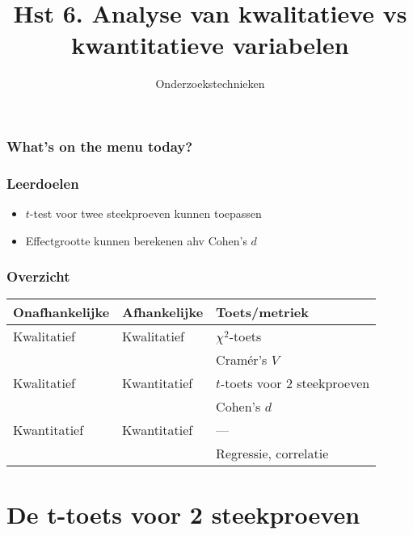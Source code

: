 \documentclass[aspectratio=169]{beamer}
\title{Hst 6. Analyse van kwalitatieve vs kwantitatieve variabelen}
\subtitle{Onderzoekstechnieken}
\begin{document}
\begin{frame}
  \maketitle
\end{frame}

\begin{frame}
  \frametitle{What's on the menu today?}

  \tableofcontents
\end{frame}

\begin{frame}
  \frametitle{Leerdoelen}

  \begin{itemize}
    \item $t$-test voor twee steekproeven kunnen toepassen
    \item Effectgrootte kunnen berekenen ahv Cohen's $d$
  \end{itemize}
\end{frame}

\begin{frame}
  \frametitle{Overzicht}
  \centering
  \begin{tabular}{lll}
    \toprule
    \textbf{Onafhankelijke} & \textbf{Afhankelijke} & \textbf{Toets/metriek}        \\
    \midrule
    Kwalitatief             & Kwalitatief           & $\chi^2$-toets                \\
    &                       & Cramér's $V$                  \\
    Kwalitatief             & Kwantitatief          & $t$-toets voor 2 steekproeven \\
    &                       & Cohen's $d$                   \\
    Kwantitatief            & Kwantitatief          & ---                           \\
    &                       & Regressie, correlatie         \\
    \bottomrule
  \end{tabular}
\end{frame}

\section{De t-toets voor 2 steekproeven}
\end{document}
